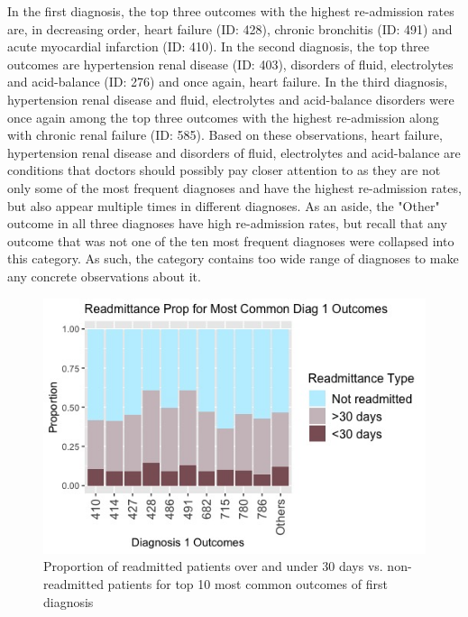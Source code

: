 \documentclass[letterpaper, 10 pt, conference]{ieeeconf}  %
\begin{document}
In the first diagnosis, the top three outcomes with the highest re-admission rates are, in decreasing order, heart failure (ID: 428), chronic bronchitis (ID: 491) and acute myocardial infarction (ID: 410). In the second diagnosis, the top three outcomes are hypertension renal disease (ID: 403),  disorders of fluid, electrolytes and acid-balance (ID: 276) and once again, heart failure. In the third diagnosis, hypertension renal disease and fluid, electrolytes and acid-balance disorders were once again among the top three outcomes with the highest re-admission along with chronic renal failure (ID: 585). Based on these observations, heart failure, hypertension renal disease and disorders of fluid, electrolytes and acid-balance are conditions that doctors should possibly pay closer attention to as they are not only some of the most frequent diagnoses and have the highest re-admission rates, but also appear multiple times in different diagnoses. As an aside, the "Other" outcome in all three diagnoses have high re-admission rates, but recall that any outcome that was not one of the ten most frequent diagnoses were collapsed into this category. As such, the category contains too wide range of diagnoses to make any concrete observations about it. 

\begin{figure}[!hbt]
\centering
\includegraphics[width=1\columnwidth]{Rplot01.png}
\caption{Proportion of readmitted patients over and under 30 days vs. non-readmitted patients for top 10 most common outcomes of first diagnosis}
\label{diag1}
\end{figure}
\end{document}
